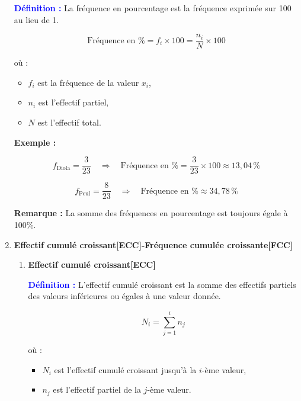 \documentclass[a4paper,12pt]{article}
\begin{document}
\begin{enumerate}[leftmargin=1.5cm, label=\textbf{\arabic*)}]
\begin{tcolorbox}[colback=red!5!white, colframe=red!60!black, boxrule=0.5pt]
\textcolor{blue}{\textbf{Définition :}}  
La fréquence en pourcentage est la fréquence exprimée sur 100 au lieu de 1.

\[
\text{Fréquence en \%} = f_i \times 100 = \frac{n_i}{N} \times 100
\]

où :
\begin{itemize}
    \item \( f_i \) est la fréquence de la valeur \( x_i \),
    \item \( n_i \) est l’effectif partiel,
    \item \( N \) est l’effectif total.
\end{itemize}
\end{tcolorbox}

\vspace{0.3cm}

\textbf{Exemple :}

\[
f_{\text{Diola}} = \frac{3}{23} \quad \Rightarrow \quad \text{Fréquence en \%} = \frac{3}{23} \times 100 \approx 13{,}04\,\%
\]

\[
f_{\text{Peul}} = \frac{8}{23} \quad \Rightarrow \quad \text{Fréquence en \%} \approx 34{,}78\,\%
\]

\vspace{0.3cm}
\begin{tcolorbox}[colback=blue!5!white, colframe=blue!60!black, boxrule=0.5pt]
\textbf{Remarque :} La somme des fréquences en pourcentage est toujours égale à 100\%.
\end{tcolorbox}

\item \textbf{Effectif cumulé croissant[ECC]-Fréquence cumulée croissante[FCC]}
\begin{enumerate}
    \item \textbf{Effectif cumulé croissant[ECC]} \\

\begin{tcolorbox}[colback=red!5!white, colframe=red!60!black, boxrule=0.5pt]
\textcolor{blue}{\textbf{Définition :}}  
L’effectif cumulé croissant est la somme des effectifs partiels des valeurs inférieures ou égales à une valeur donnée.

\[
N_i = \sum_{j=1}^{i} n_j
\]

où :
\begin{itemize}
    \item \( N_i \) est l’effectif cumulé croissant jusqu’à la \( i \)-ème valeur,
    \item \( n_j \) est l’effectif partiel de la \( j \)-ème valeur.
\end{itemize}
\end{tcolorbox}


\end{enumerate}
\end{enumerate}
\end{document}

